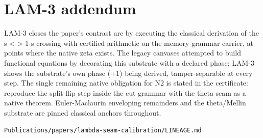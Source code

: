 \hypertarget{lam-3-addendum}{%
\section{LAM-3 addendum}\label{lam-3-addendum}}

LAM-3 closes the paper's contrast arc by executing the classical
derivation of the s \textless-\textgreater{} 1-s crossing with certified arithmetic on the
memory-grammar carrier, at points where the native zeta exists. The
legacy canvases attempted to build functional equations by decorating
this substrate with a declared phase; LAM-3 shows the substrate's own
phase (+1) being derived, tamper-separable at every step. The single
remaining native obligation for N2 is stated in the certificate:
reproduce the split-flip step inside the cut grammar with the theta
seam as a native theorem. Euler-Maclaurin enveloping remainders and
the theta/Mellin substrate are pinned classical anchors throughout.

\begin{flushright}\small\texttt{Publications/papers/lambda-seam-calibration/LINEAGE.md}\end{flushright}
